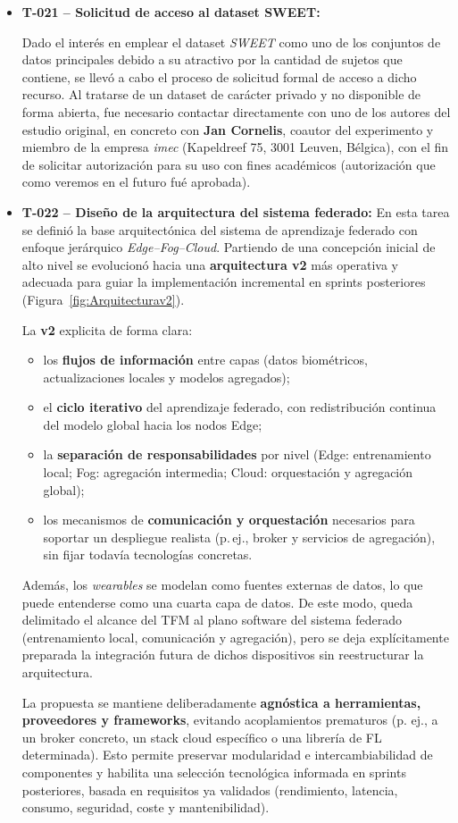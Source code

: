 \documentclass{report}
\begin{document}
\begin{itemize}
\item \textbf{T-021 – Solicitud de acceso al dataset SWEET:}  

Dado el interés en emplear el dataset \textit{SWEET} como uno de los conjuntos de datos principales debido a su atractivo por la cantidad de sujetos que contiene, se llevó a cabo el proceso de solicitud formal de acceso a dicho recurso.  
Al tratarse de un dataset de carácter privado y no disponible de forma abierta, fue necesario contactar directamente con uno de los autores del estudio original, en concreto con \textbf{Jan Cornelis}, coautor del experimento y miembro de la empresa \textit{imec} (Kapeldreef 75, 3001 Leuven, Bélgica), con el fin de solicitar autorización para su uso con fines académicos (autorización que como veremos en el futuro  fué aprobada).

\item \textbf{T-022 – Diseño de la arquitectura del sistema federado:}
En esta tarea se definió la base arquitectónica del sistema de aprendizaje federado con enfoque jerárquico \textit{Edge--Fog--Cloud}. Partiendo de una concepción inicial de alto nivel se evolucionó hacia una \textbf{arquitectura v2} más operativa y adecuada para guiar la implementación incremental en sprints posteriores (Figura~\ref{fig:Arquitecturav2}).

La \textbf{v2} explicita de forma clara:
\begin{itemize}\setlength\itemsep{0.15em}
    \item los \textbf{flujos de información} entre capas (datos biométricos, actualizaciones locales y modelos agregados);
    \item el \textbf{ciclo iterativo} del aprendizaje federado, con redistribución continua del modelo global hacia los nodos Edge;
    \item la \textbf{separación de responsabilidades} por nivel (Edge: entrenamiento local; Fog: agregación intermedia; Cloud: orquestación y agregación global);
    \item los mecanismos de \textbf{comunicación y orquestación} necesarios para soportar un despliegue realista (p.\,ej., broker y servicios de agregación), sin fijar todavía tecnologías concretas.
\end{itemize}

Además, los \textit{wearables} se modelan como fuentes externas de datos, lo que puede entenderse como una cuarta capa de datos. De este modo, queda delimitado el alcance del TFM al plano software del sistema federado (entrenamiento local, comunicación y agregación), pero se deja explícitamente preparada la integración futura de dichos dispositivos sin reestructurar la arquitectura.

La propuesta se mantiene deliberadamente \textbf{agnóstica a herramientas, proveedores y frameworks}, evitando acoplamientos prematuros (p. ej., a un broker concreto, un stack cloud específico o una librería de FL determinada). Esto permite preservar modularidad e intercambiabilidad de componentes y habilita una selección tecnológica informada en sprints posteriores, basada en requisitos ya validados (rendimiento, latencia, consumo, seguridad, coste y mantenibilidad).
\end{itemize}
\end{document}
